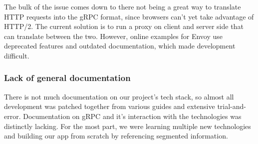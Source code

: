             The bulk of the issue comes down to there not being a great way to translate HTTP requests into the gRPC format, since browsers can't yet take advantage of HTTP/2. The current solution is to run a proxy on client and server side that can translate between the two. However, online examples for Envoy use deprecated features and outdated documentation, which made development difficult.
        

        \subsubsection{Lack of general documentation}
            There is not much documentation on our project's tech stack, so almost all development was patched together from various guides and extensive trial-and-error. Documentation on gRPC and it's interaction with the technologies was distinctly lacking. For the most part, we were learning multiple new technologies and building our app from scratch by referencing segmented information.
    